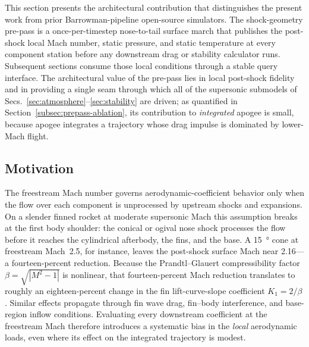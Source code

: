 
This section presents the architectural contribution that distinguishes the
present work from prior Barrowman-pipeline open-source simulators. The
shock-geometry pre-pass is a once-per-timestep nose-to-tail surface march that
publishes the post-shock local Mach number, static pressure, and static
temperature at every component station before any downstream drag or stability
calculator runs. Subsequent sections consume those local conditions through a
stable query interface. The architectural value of the pre-pass lies in local
post-shock fidelity and in providing a single seam through which all of the
supersonic submodels of Secs.~\ref{sec:atmosphere}--\ref{sec:stability} are driven; as quantified in
Section~\ref{subsec:prepass-ablation}, its contribution to \emph{integrated}
apogee is small, because apogee integrates a trajectory whose drag impulse is
dominated by lower-Mach flight.

\subsection{Motivation}

The freestream Mach number governs aerodynamic-coefficient behavior only when
the flow over each component is unprocessed by upstream shocks and expansions.
On a slender finned rocket at moderate supersonic Mach this assumption breaks at
the first body shoulder: the conical or ogival nose shock processes the flow
before it reaches the cylindrical afterbody, the fins, and the base. A
\SI{15}{\degree} cone at freestream Mach~2.5, for instance, leaves the
post-shock surface Mach near 2.16---a fourteen-percent reduction. Because the
Prandtl--Glauert compressibility factor $\beta = \sqrt{|M^2 - 1|}$ is nonlinear,
that fourteen-percent Mach reduction translates to roughly an eighteen-percent
change in the fin lift-curve-slope coefficient $K_1 = 2/\beta$. Similar effects
propagate through fin wave drag, fin--body interference, and base-region inflow
conditions. Evaluating every downstream coefficient at the freestream Mach
therefore introduces a systematic bias in the \emph{local} aerodynamic loads,
even where its effect on the integrated trajectory is modest.

